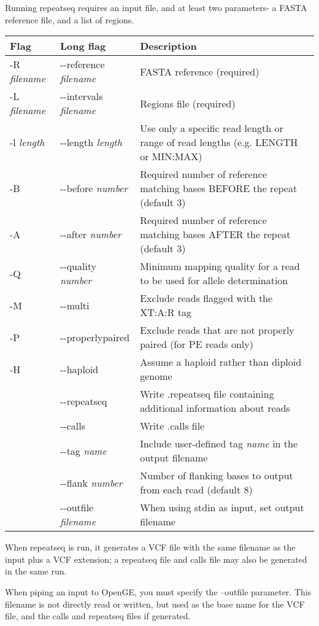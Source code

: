 \documentclass[11pt]{article}
\begin{document}
Running repeatseq requires an input file, and at least two parameters- a FASTA reference file, and a list of regions.

\begin{center}
\begin{tabular}{llp{3.5in}}
\hline
Flag&Long flag&Description\\ \hline
 -R \textit{filename}&{-}{-}reference \textit{filename}&FASTA reference (required)\\
 -L \textit{filename}&{-}{-}intervals \textit{filename}&Regions file (required)\\
 -l \textit{length}&{-}{-}length \textit{length}&Use only a specific read length or range of read lengths (e.g. LENGTH or MIN:MAX)\\
 -B&{-}{-}before \textit{number}&Required number of reference matching bases BEFORE the repeat (default 3)\\
 -A&{-}{-}after \textit{number}&Required number of reference matching bases AFTER the repeat (default 3)\\
 -Q&{-}{-}quality \textit{number}&Minimum mapping quality for a read to be used for allele determination\\
 -M&{-}{-}multi&Exclude reads flagged with the XT:A:R tag\\
 -P&{-}{-}properlypaired&Exclude reads that are not properly paired (for PE reads only)\\
 -H&{-}{-}haploid&Assume a haploid rather than diploid genome\\
 &{-}{-}repeatseq&Write .repeatseq file containing additional information about reads\\
 &{-}{-}calls&Write .calls file\\
 &{-}{-}tag \textit{name}&Include user-defined tag \textit{name} in the output filename\\
 &{-}{-}flank \textit{number}&Number of flanking bases to output from each read (default 8)\\
 &{-}{-}outfile \textit{filename}&When using stdin as input, set output filename\\
\end{tabular}
\end{center}

When repeatseq is run, it generates a VCF file with the same filename as the input plus a VCF extension; a repeatseq file and calls file may also be generated in the same run.

When piping an input to OpenGE, you must specify the --outfile parameter. This filename is not directly read or written, but used as the base name for the VCF file, and the calls and repeatseq files if generated.
\end{document}
